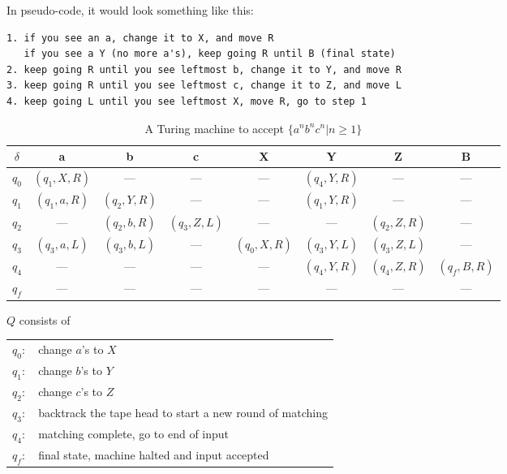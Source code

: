 \documentclass[10pt,a4paper,final]{article}
\begin{document}
\begin{enumerate}
In pseudo-code, it would look something like this:
\begin{verbatim}
1. if you see an a, change it to X, and move R
   if you see a Y (no more a's), keep going R until B (final state)
2. keep going R until you see leftmost b, change it to Y, and move R
3. keep going R until you see leftmost c, change it to Z, and move L
4. keep going L until you see leftmost X, move R, go to step 1
\end{verbatim}

\begin{table}[h!] %
\begin{center}
\begin{tabular}{c| c c c c c c c}
$\delta$ & a        & b           & c           & X           & Y           & Z            & B \\
\hline
$q_0$ & $(q_1,X,R)$ & ---         & ---         & ---         & $(q_4,Y,R)$ & ---          & --- \\
$q_1$ & $(q_1,a,R)$ & $(q_2,Y,R)$ & ---         & ---         & $(q_1,Y,R)$ & ---          & --- \\
$q_2$ & ---         & $(q_2,b,R)$ & $(q_3,Z,L)$ & ---         & ---         & $(q_2,Z,R)$  & --- \\
$q_3$ & $(q_3,a,L)$ & $(q_3,b,L)$ & ---         & $(q_0,X,R)$ & $(q_3,Y,L)$ & $(q_3,Z,L)$  & --- \\
$q_4$ & ---         & ---         & ---         & ---         & $(q_4,Y,R)$ & $(q_4,Z,R)$  & $(q_f,B,R)$ \\
\hline
$q_f$ & ---         & ---         & ---         & ---         & ---         & ---          & ---
\end{tabular}
\end{center}
\caption{A Turing machine to accept $\{a^n b^n c^n | n \geq 1\}$}
\end{table}

$Q$ consists of
\begin{tabular}{c l}
$q_0:$ & change $a$'s to $X$ \\
$q_1:$ & change $b$'s to $Y$ \\
$q_2:$ & change $c$'s to $Z$ \\
$q_3:$ & backtrack the tape head to start a new round of matching \\
$q_4:$ & matching complete, go to end of input \\
$q_f:$ & final state, machine halted and input accepted
\end{tabular}


\end{enumerate}
\end{document}
